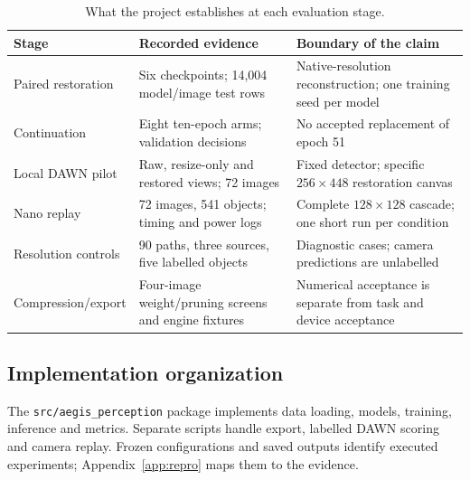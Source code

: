 \begin{table}[t]
\centering\small
\caption{What the project establishes at each evaluation stage.}
\label{tab:status}
\begin{tabularx}{\textwidth}{@{}p{}YY@{}}
\toprule Stage & Recorded evidence & Boundary of the claim\\\midrule
Paired restoration & Six checkpoints; 14,004 model/image test rows & Native-resolution reconstruction; one training seed per model\\
Continuation & Eight ten-epoch arms; validation decisions & No accepted replacement of epoch 51\\
Local DAWN pilot & Raw, resize-only and restored views; 72 images & Fixed detector; specific $256\times448$ restoration canvas\\
Nano replay & 72 images, 541 objects; timing and power logs & Complete $128\times128$ cascade; one short run per condition\\
Resolution controls & 90 paths, three sources, five labelled objects & Diagnostic cases; camera predictions are unlabelled\\
Compression/export & Four-image weight/pruning screens and engine fixtures & Numerical acceptance is separate from task and device acceptance\\
\bottomrule
\end{tabularx}
\end{table}

\subsection{Implementation organization}
The \texttt{src/aegis\_perception} package implements data loading, models,
training, inference and metrics. Separate scripts handle export, labelled
DAWN scoring and camera replay. Frozen configurations and saved outputs identify
executed experiments; Appendix~\ref{app:repro} maps them to the evidence.
